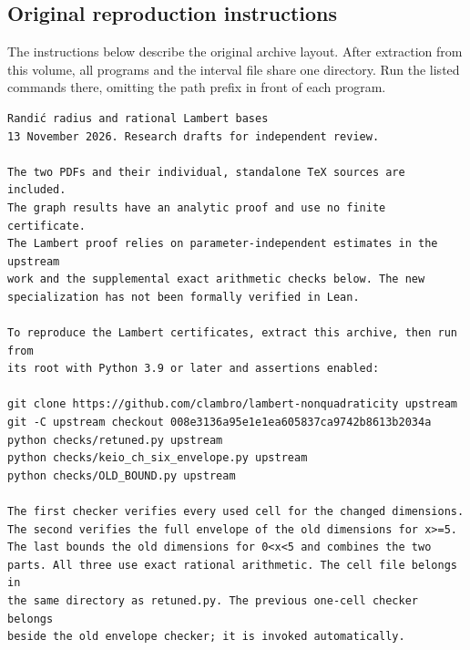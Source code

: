 \documentclass[11pt,a4paper]{article}
\begin{document}
\subsection*{Original reproduction instructions}
The instructions below describe the original archive layout. After extraction from this volume, all programs and the interval file share one directory. Run the listed commands there, omitting the path prefix in front of each program.
\begin{Verbatim}[fontsize=\footnotesize,breakanywhere=false]
Randić radius and rational Lambert bases
13 November 2026. Research drafts for independent review.

The two PDFs and their individual, standalone TeX sources are included.
The graph results have an analytic proof and use no finite certificate.
The Lambert proof relies on parameter-independent estimates in the upstream
work and the supplemental exact arithmetic checks below. The new
specialization has not been formally verified in Lean.

To reproduce the Lambert certificates, extract this archive, then run from
its root with Python 3.9 or later and assertions enabled:

git clone https://github.com/clambro/lambert-nonquadraticity upstream
git -C upstream checkout 008e3136a95e1e1ea605837ca9742b8613b2034a
python checks/retuned.py upstream
python checks/keio_ch_six_envelope.py upstream
python checks/OLD_BOUND.py upstream

The first checker verifies every used cell for the changed dimensions.
The second verifies the full envelope of the old dimensions for x>=5.
The last bounds the old dimensions for 0<x<5 and combines the two
parts. All three use exact rational arithmetic. The cell file belongs in
the same directory as retuned.py. The previous one-cell checker belongs
beside the old envelope checker; it is invoked automatically.
\end{Verbatim}
\end{document}
